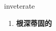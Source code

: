 
\begin{frame}
{\huge inveterate}
\begin{center}
\begin{enumerate}\Large
  \item \textbf{根深蒂固的}
\end{enumerate}
\end{center}
\end{frame}
